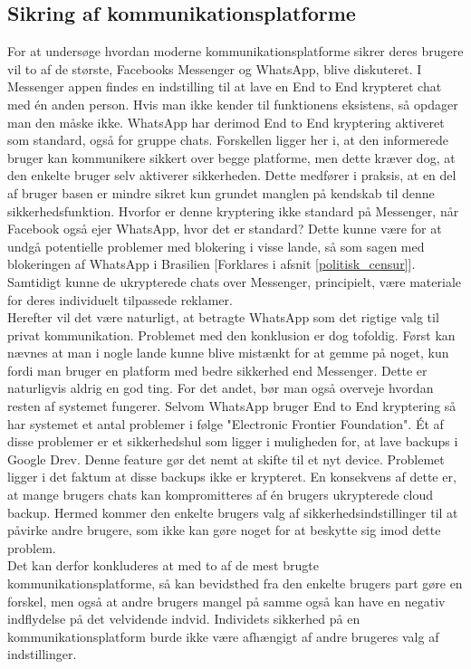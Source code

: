 \subsection{Sikring af kommunikationsplatforme}
\label{kommunikationsplatforme}
For at undersøge hvordan moderne kommunikationsplatforme sikrer deres brugere vil to af de største, Facebooks Messenger og WhatsApp, blive diskuteret. I Messenger appen findes en indstilling til at lave en End to End krypteret chat med én anden person. Hvis man ikke kender til funktionens eksistens, så opdager man den måske ikke. WhatsApp har derimod End to End kryptering aktiveret som standard, også for gruppe chats. Forskellen ligger her i, at den informerede bruger kan kommunikere sikkert over begge platforme, men dette kræver dog, at den enkelte bruger selv aktiverer sikkerheden. Dette medfører i praksis, at en del af bruger basen er mindre sikret kun grundet manglen på kendskab til denne sikkerhedsfunktion. Hvorfor er denne kryptering ikke standard på Messenger, når Facebook også ejer WhatsApp\cite{Facebook_WhatsApp_Merger}, hvor det er standard? Dette kunne være for at undgå potentielle problemer med blokering i visse lande\cite{Facebook_security_features}, så som sagen med blokeringen af WhatsApp i Brasilien [Forklares i afsnit \ref{politisk_censur}]. Samtidigt kunne de ukrypterede chats over Messenger, principielt, være materiale for deres individuelt tilpassede reklamer.
\\
Herefter vil det være naturligt, at betragte WhatsApp som det rigtige valg til privat kommunikation. Problemet med den konklusion er dog tofoldig. Først kan nævnes at man i nogle lande kunne blive mistænkt for at gemme på noget, kun fordi man bruger en platform med bedre sikkerhed end Messenger. Dette er naturligvis aldrig en god ting. For det andet, bør man også overveje hvordan resten af systemet fungerer. Selvom WhatsApp bruger End to End kryptering så har systemet et antal problemer i følge "Electronic Frontier Foundation"\cite{WhatsApp_Security_Concerns}. Ét af disse problemer er et sikkerhedshul som ligger i muligheden for, at lave backups i Google Drev. Denne feature gør det nemt at skifte til et nyt device. Problemet ligger i det faktum at disse backups ikke er krypteret. En konsekvens af dette er, at mange brugers chats kan kompromitteres af én brugers ukrypterede cloud backup. Hermed kommer den enkelte brugers valg af sikkerhedsindstillinger til at påvirke andre brugere, som ikke kan gøre noget for at beskytte sig imod dette problem.
\\
Det kan derfor konkluderes at med to af de mest brugte kommunikationsplatforme, så kan bevidsthed fra den enkelte brugers part gøre en forskel, men også at andre brugers mangel på samme også kan have en negativ indflydelse på det velvidende indvid. Individets sikkerhed på en kommunikationsplatform burde ikke være afhængigt af andre brugeres valg af indstillinger.